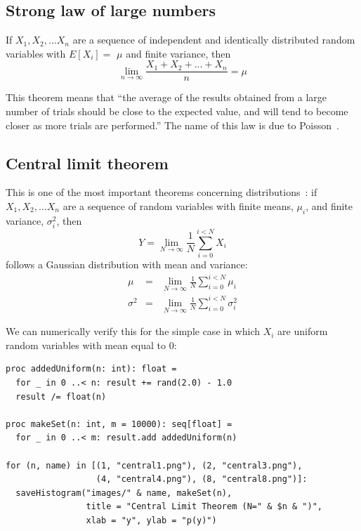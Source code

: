 \documentclass[justified, sixbynine]{tufte-book}
\theoremstyle{plain}%
\newtheorem * {corollary}{Corollary}
\theoremstyle{definition}
\theoremstyle{remark}
\newtheorem * {remark}{Remark}
\newtheorem * {note}{Note}
\begin{document}
\begin{fullwidth}
\goodbreak\subsection{Strong law of large numbers}

If $X_1, X_2, ...X_n$ are a sequence of independent and identically
distributed random variables with $E[X_i]=$ $\mu $ and finite variance, then
\begin{equation}
\lim_{n\rightarrow \infty }\frac{X_1+X_2+...+X_n}n=\mu
\end{equation}

This theorem means that ``the average of the results obtained from a large number of trials should be close to the expected value, and will tend to become closer as more trials are performed.'' The name of this law is due to Poisson~\cite{largenumbers}.

\goodbreak\subsection{Central limit theorem}

This is one of the most important theorems concerning distributions~\cite{central}:
if $X_1, X_2, ...X_n$ are a sequence of random variables with finite means, $\mu_i$, and finite variance, $\sigma^2_i$, then
\begin{equation}
Y = \lim_{N\rightarrow\infty}\frac1N \sum_{i=0}^{i<N} X_i
\end{equation}
follows a Gaussian distribution with mean and variance:
\begin{eqnarray}
\mu &=& \lim_{N\rightarrow\infty}\frac1N \sum_{i=0}^{i<N} \mu_i \\
\sigma^2 &=& \lim_{N\rightarrow\infty}\frac1N \sum_{i=0}^{i<N} \sigma^2_i
\end{eqnarray}

We can numerically verify this for the simple case in which $X_i$ are uniform random variables with mean equal to 0:

\begin{lstlisting}
proc addedUniform(n: int): float =
  for _ in 0 ..< n: result += rand(2.0) - 1.0
  result /= float(n)

proc makeSet(n: int, m = 10000): seq[float] =
  for _ in 0 ..< m: result.add addedUniform(n)

for (n, name) in [(1, "central1.png"), (2, "central3.png"),
                  (4, "central4.png"), (8, "central8.png")]:
  saveHistogram("images/" & name, makeSet(n),
                title = "Central Limit Theorem (N=" & $n & ")",
                xlab = "y", ylab = "p(y)")
\end{lstlisting}


\end{fullwidth}
\end{document}
